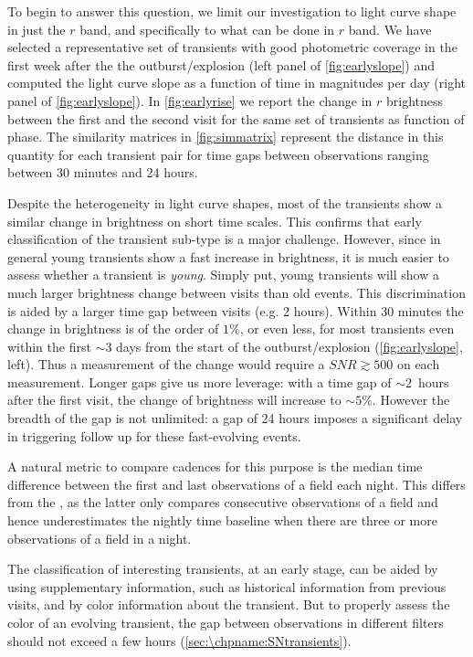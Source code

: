 To begin to answer this question, we limit our investigation to light curve shape in just the $r$ band, and specifically to what can be done in $r$ band. We have selected a representative set of transients with good photometric coverage in the first week after the the outburst/explosion (left panel of \autoref{fig:earlyslope}) and computed the light curve slope as a function of time in magnitudes per day (right panel of \autoref{fig:earlyslope}). In \autoref{fig:earlyrise} we report the change in $r$ brightness between the first and the second visit for the same set of transients as function of phase. The similarity matrices in \autoref{fig:simmatrix} represent the distance in this quantity for each transient pair for time gaps between observations ranging between 30 minutes and 24 hours.

Despite the heterogeneity in light curve shapes, most of the transients show a similar change in brightness on short time scales.
This confirms that early classification of the transient sub-type is a
major challenge. However, since in general young transients show a fast
increase in brightness, it is much easier to assess whether a transient is
\emph{young}.  Simply put, young transients will show a much larger
brightness change between visits than old events.
This discrimination is aided by a larger time gap between visits (e.g. 2 hours).
Within 30 minutes the change in brightness is of the order of $1\%$, or
even less, for most transients even within the first $\sim3$ days from the
start of the outburst/explosion (\autoref{fig:earlyslope}, left). Thus a
measurement of the change would require a $SNR\gtrsim500$ on each
measurement. Longer gaps give us more leverage: with a time gap of
$\sim2$~hours after the first visit, the change of brightness will increase
to $\sim5\%$. However the breadth of the gap is not unlimited: a gap of 24
hours imposes a significant delay in triggering follow up for these
fast-evolving events.

A natural metric to compare cadences for this purpose
is the median time difference between
the first and last observations of a field each night.  This differs from
the , as the latter only compares consecutive
observations of a field and hence underestimates the nightly time baseline
when there are three or more observations of a field in a night.

The classification of interesting transients, at an early stage, can be
aided by using supplementary information, such as historical information
from previous visits, and by color information about the transient. But to
properly assess the color of an evolving transient, the
gap between observations in different filters should not exceed a few hours
(\autoref{sec:\chpname:SNtransients}).

